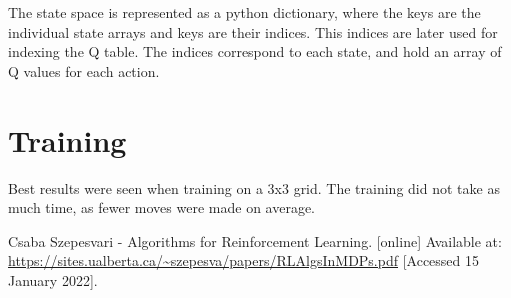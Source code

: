 \documentclass[lettersize,journal]{IEEEtran}
\begin{document}
The state space is represented as a python dictionary, where the keys are
the individual state arrays and keys are their indices. This indices are later
used for indexing the Q table. The indices correspond to each state, and hold
an array of Q values for each action.


\section{Training}
Best results were seen when training on a 3x3 grid.
The training did not take as much time, as fewer moves
were made on average.

\begin{thebibliography}{1}
    Csaba Szepesvari - Algorithms for Reinforcement Learning. [online] Available at: \url{https://sites.ualberta.ca/~szepesva/papers/RLAlgsInMDPs.pdf} [Accessed 15 January 2022].

\end{thebibliography}
\end{document}
